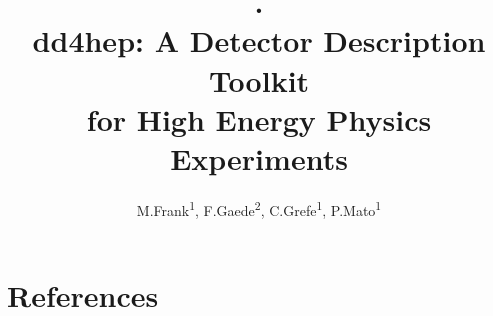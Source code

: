 \documentclass[a4paper]{jpconf}
\begin{document}
\title{
\vspace{-3cm}.\\
dd4hep: A Detector Description Toolkit \\
for High Energy Physics Experiments}

\author{
M.Frank\textsuperscript{1},
F.Gaede\textsuperscript{2},
C.Grefe\textsuperscript{1},
P.Mato\textsuperscript{1}
}

\address{\textsuperscript{1} CERN, 1211 Geneva 23, Switzerland}
\address{\textsuperscript{2} Desy, 22607 Hamburg, Germany}


\begin{abstract}

\end{abstract}



\vspace{-0.1cm}
\section*{References}
\begin{thebibliography}{9}

\end{thebibliography}
\end{document}
